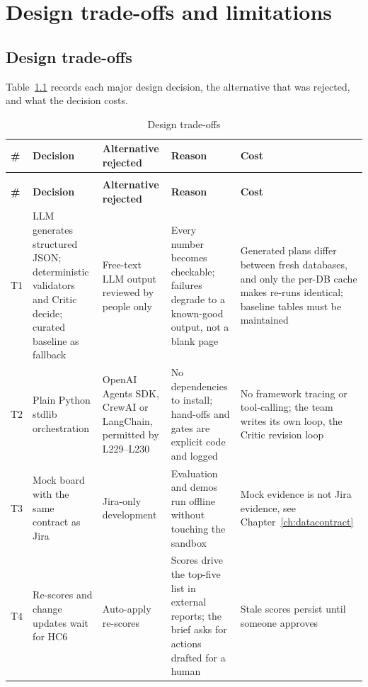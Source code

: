 \chapter{Design trade-offs and limitations}
\label{ch:tradeoffs}

\section{Design trade-offs}

Table~\ref{tab:tradeoffs} records each major design decision, the alternative that was rejected, and what the decision costs.

{\footnotesize
\setlength{\tabcolsep}{3pt}
\begin{longtable}{@{}>{\raggedright\arraybackslash}p{0.6cm}>{\raggedright\arraybackslash}p{3.2cm}>{\raggedright\arraybackslash}p{2.8cm}>{\raggedright\arraybackslash}p{3.9cm}>{\raggedright\arraybackslash}p{4.3cm}@{}}
\caption{Design trade-offs}\label{tab:tradeoffs}\\
\toprule
\textbf{\#} & \textbf{Decision} & \textbf{Alternative rejected} & \textbf{Reason} & \textbf{Cost} \\
\midrule
\endfirsthead
\multicolumn{5}{@{}l}{\small\itshape Table~\thetable\ continued}\\
\toprule
\textbf{\#} & \textbf{Decision} & \textbf{Alternative rejected} & \textbf{Reason} & \textbf{Cost} \\
\midrule
\endhead
\bottomrule
\endfoot
T1 & LLM generates structured JSON; deterministic validators and Critic decide; curated baseline as fallback & Free-text LLM output reviewed by people only & Every number becomes checkable; failures degrade to a known-good output, not a blank page & Generated plans differ between fresh databases, and only the per-DB cache makes re-runs identical; baseline tables must be maintained \\
T2 & Plain Python stdlib orchestration & OpenAI Agents SDK, CrewAI or LangChain, permitted by L229--L230 & No dependencies to install; hand-offs and gates are explicit code and logged & No framework tracing or tool-calling; the team writes its own loop, the Critic revision loop \\
T3 & Mock board with the same contract as Jira & Jira-only development & Evaluation and demos run offline without touching the sandbox & Mock evidence is not Jira evidence, see Chapter~\ref{ch:datacontract} \\
T4 & Re-scores and change updates wait for HC6 & Auto-apply re-scores & Scores drive the top-five list in external reports; the brief asks for actions drafted for a human & Stale scores persist until someone approves \\

\end{longtable}}
